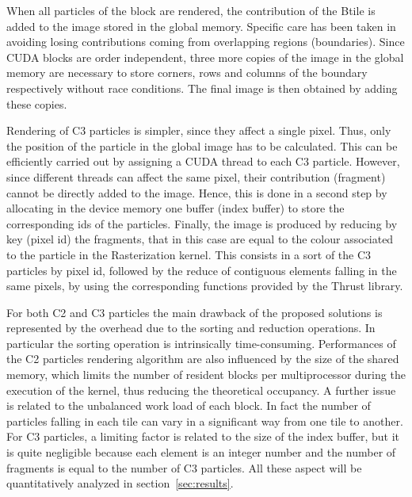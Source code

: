 \documentclass[11pt]{article}
\begin{document}
When all particles of the block are rendered, the contribution of the Btile 
is added to the image stored in the global memory. 
Specific care has been taken in avoiding losing contributions coming 
from overlapping regions (boundaries). Since CUDA blocks are order independent, three more copies of the image in the global memory are necessary to store corners, rows and columns of the boundary respectively without race conditions. The final image is then obtained by adding these copies.

Rendering of C3 particles is simpler, since they affect a single pixel. 
Thus, only the position of the particle in the global image has to be calculated.
This can be efficiently carried out by assigning a CUDA thread to each C3 particle. 
However, since different threads can affect the same pixel, their contribution (fragment) cannot be directly added to the image. Hence, this is done in a second step by allocating in the device memory one buffer (index buffer) to store the corresponding ids of the particles. Finally, the image is produced by reducing by key (pixel id) the fragments, that in this case are equal to the colour associated to the particle in the Rasterization kernel. This consists in a sort of the C3 particles by pixel id, followed by the reduce of 
contiguous elements falling in the same pixels, by using the corresponding 
functions provided by the Thrust library.

For both C2 and C3 particles the main drawback of the proposed solutions 
is represented by the overhead due to the sorting and reduction operations. In particular the sorting operation is intrinsically time-consuming.
Performances of the C2 particles rendering algorithm are also influenced 
by the size of the shared memory, which limits the number of resident blocks
per multiprocessor during the execution of the kernel, thus reducing the theoretical
occupancy. A further issue is related to the
unbalanced work load of each block. In fact the number of particles falling
in each tile can vary in a significant way from one tile to another. 
For C3 particles, a limiting factor is related to the size of the index buffer, but it is quite negligible because each element is an integer number and the number of fragments is equal to the number of C3 particles.
All these aspect will be quantitatively analyzed in section~\ref{sec:results}.
\end{document}
